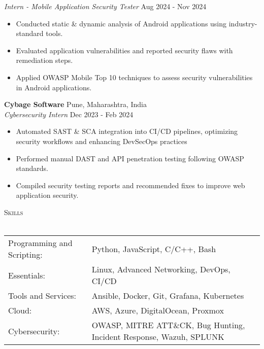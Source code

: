 \documentclass[a4paper]{article}
\newcommand{\lineunder} {
    \vspace*{-8pt} \\
    \hspace*{-18pt} \hrulefill \\
}
\newcommand{\header} [1] {
    {\hspace*{-18pt}\vspace*{6pt} \textsc{#1}}
    \vspace*{-6pt} \lineunder
}
\begin{document}
\textit{Intern - Mobile Application Security Tester} \hfill Aug 2024 - Nov 2024\\
\vspace{-1mm}
\begin{itemize} \itemsep 1pt
	\item Conducted static \& dynamic analysis of Android applications using industry-standard tools.
	\item Evaluated application vulnerabilities and reported security flaws with remediation steps.
	\item Applied OWASP Mobile Top 10 techniques to assess security vulnerabilities in Android applications.
\end{itemize}
\textbf{Cybage Software} \hfill Pune, Maharashtra, India\\
\textit{Cybersecurity Intern} \hfill Dec 2023 - Feb 2024\\
\vspace{-1mm}
\begin{itemize} \itemsep 1pt
	\item Automated SAST \& SCA integration into CI/CD pipelines, optimizing security workflows and enhancing DevSecOps practices
	\item Performed manual DAST and API penetration testing following OWASP standards.
	\item Compiled security testing reports and recommended fixes to improve web application security.
\end{itemize}

\header{Skills}
\begin{tabular}{ l l }
	Programming and Scripting: & Python, JavaScript, C/C++, Bash                                     \\
	Essentials:                & Linux, Advanced Networking, DevOps, CI/CD                           \\
	Tools and Services:        & Ansible, Docker, Git, Grafana, Kubernetes                           \\
	Cloud:                     & AWS, Azure, DigitalOcean, Proxmox                                   \\
	Cybersecurity:             & OWASP, MITRE ATT\&CK, Bug Hunting, Incident Response, Wazuh, SPLUNK \\
\end{tabular}
\vspace{2mm}
\end{document}

